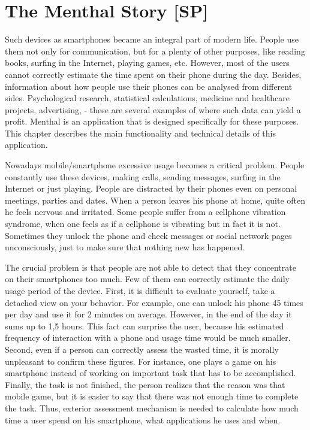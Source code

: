 \chapter{The Menthal Story [SP]}
\label{chap:menthal_story}
Such devices as smartphones became an integral part of modern life.
People use them not only for communication, but for a plenty of other purposes, like reading books, surfing in the Internet, playing games, etc.
However, most of the users cannot correctly estimate the time spent on their phone during the day.
Besides, information about how people use their phones can be analysed from different sides.
Psychological research, statistical calculations, medicine and healthcare projects, advertising, - these are several examples of where such data can yield a profit.
Menthal is an application that is designed specifically for these purposes.
This chapter describes the main functionality and technical details of this application.

Nowadays mobile/smartphone excessive usage becomes a critical problem.
People constantly use these devices, making calls, sending messages, surfing in the Internet or just playing.
People are distracted by their phones even on personal meetings, parties and dates.
When a person leaves his phone at home, quite often he feels nervous and irritated.
Some people suffer from a cellphone vibration syndrome, when one feels as if a cellphone is vibrating but in fact it is not.
Sometimes they unlock the phone and check messages or social network pages unconsciously, just to make sure that nothing new has happened. 

The crucial problem is that people are not able to detect that they concentrate on their smartphones too much.
Few of them can correctly estimate the daily usage period of the device.
First, it is difficult to evaluate yourself, take a detached view on your behavior.
For example, one can unlock his phone 45 times per day and use it for 2 minutes on average.
However, in the end of the day it sums up to 1,5 hours.
This fact can surprise the user, because his estimated frequency of interaction with a phone and usage time would be much smaller.
Second, even if a person can correctly assess the wasted time, it is morally unpleasant to confirm these figures.
For instance, one plays a game on his smartphone instead of working on important task that has to be accomplished.
Finally, the task is not finished, the person realizes that the reason was that mobile game, but it is easier to say that there was not enough time to complete the task.  
Thus, exterior assessment mechanism is needed to calculate how much time a user spend on his smartphone, what applications he uses and when.    

